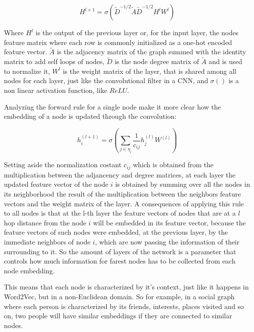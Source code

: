 \documentclass[%
    corpo=13.5pt,
    twoside,
    oldstyle,
    tipotesi=magistrale,
    greek,
    evenboxes
]{toptesi}
\begin{document}
\begin{equation}
H^{l+1}=\sigma(\tilde{D}^{-1/2}\tilde{A}\tilde{D}^{-1/2}H^lW^l)
\end{equation}

Where $H^{l}$ is the output of the previous layer or, for the input layer, the
nodes feature matrix where each row is commonly initialized
as a one-hot encoded feature vector. $\tilde{A}$ is the adjacency matrix
of the graph summed with the identity matrix to add self loops of nodes,
$\tilde{D}$ is the node degree matrix of $\tilde{A}$ and is used to
normalize it, $W^l$ is the weight matrix of the layer, that is shared
among all nodes for each layer, just like the convolutional filter in a CNN,
and $\sigma()$ is a non linear activation function, like $ReLU$.

Analyzing the forward rule for a single node make it more clear how the
embedding of a node is updated through the convolution:

\begin{equation}
    h^{(l+1)}_{i}=\sigma(\sum_{j\in\eta_{i}} \frac{1}{c_{ij}}h_j^{(l)}W^{{(l)}})
\end{equation}

Setting aside the normalization costant $c_{ij}$ which is obtained from the
multiplication between the adjancency and degree matrices, at each layer the
updated feature vector of the node $i$ is obtained by summing over all the
nodes in its neighborhood the result of the multiplication between the
neighbors feature vectors and the weight matrix of the layer.
A consequences of applying this rule to all nodes is that at the l-th layer
the feature vectors of nodes that are at a $l$ hop distance from the node $i$
will be embedded in its feature vector, because the feature vectors of such
nodes were embedded, at the previous layer, by the immediate neighbors of
node $i$, which are now passing the information of their surrounding to it.
So the amount of layers of the network is a parameter that controls how much
information for farest nodes has to be collected from each node embedding.

This means that each node is characterized by it's context,
just like it happens in Word2Vec, but in a non-Euclidean domain.
So for example, in a social graph where each person is characterized by its
friends, interests, places visited and so on, two people will have similar
embeddings if they are connected to similar nodes.
\end{document}
